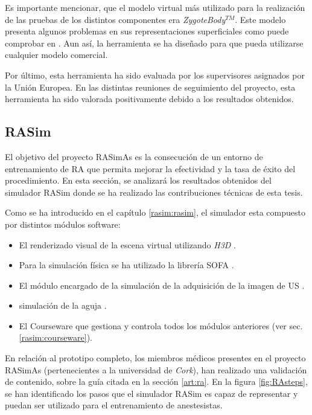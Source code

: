 Es importante mencionar, que el modelo virtual más utilizado para la realización de las pruebas de los distintos componentes era \emph{ZygoteBody}$^{TM}$. Este modelo presenta algunos problemas en sus representaciones superficiales como puede comprobar en \cite{zaitseva}. Aun así, la herramienta se ha diseñado para que pueda utilizarse cualquier modelo comercial.%

Por último, esta herramienta ha sido evaluada por los supervisores asignados por la Unión Europea. En las distintas reuniones de seguimiento del proyecto, esta herramienta ha sido valorada positivamente debido a los resultados obtenidos.




\subsection{RASim}
\label{result:rasim}

El objetivo del proyecto \ac{RASimAs} es la consecución de un entorno de entrenamiento de \ac{RA} que permita mejorar la efectividad y la tasa de éxito del procedimiento.  En esta sección, se analizará los resultados obtenidos del simulador \ac{RASim} donde se ha realizado las contribuciones técnicas de esta tesis.

Como se ha introducido en el capítulo \ref{rasim:rasim}, el simulador esta compuesto por distintos módulos software:

\begin{itemize}
    \item El renderizado visual de la escena virtual utilizando \emph{H3D} \cite{sensegraphics2012open}.
    \item Para la simulación física se ha utilizado la librería \ac{SOFA} \cite{sofaweb}.
    \item El módulo encargado de la simulación de la adquisición de la imagen de \ac{US} \cite{Law2015}.
    \item simulación de la aguja \cite{needleinsertion}.
    \item El \ac{Courseware} que gestiona y controla todos los módulos anteriores (ver sec. \ref{rasim:courseware}).
\end{itemize}


En relación al prototipo completo, los miembros médicos presentes en el proyecto \ac{RASimAs} (pertenecientes a la universidad de \emph{Cork}), han realizado una validación de contenido, sobre la guía citada en la sección \ref{art:ra}. En la figura \ref{fig:RAsteps}, se han identificado los pasos que el simulador \ac{RASim} es capaz de representar y puedan ser utilizado para el entrenamiento de anestesistas. %


